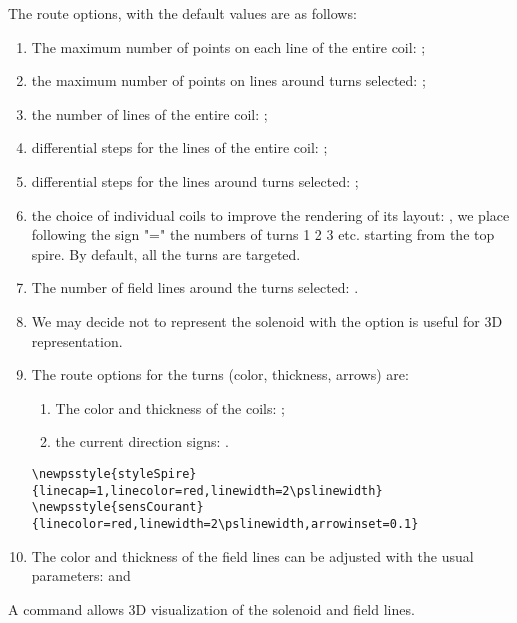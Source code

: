 \documentclass[11pt,english,BCOR10mm,DIV12,bibliography=totoc,parskip=false,smallheadings
    headexclude,footexclude,oneside]{pst-doc}
\begin{document}
The route options, with the default values are as follows:
\begin{enumerate}
  \item The maximum number of points on each line of the entire coil: ;
  \item the maximum number of points on lines around turns selected: ;
  \item the number of lines of the entire coil: ;
  \item differential steps for the lines of the entire coil: ;
  \item differential steps for the lines around turns selected: ;
  \item the choice of individual coils to improve the rendering of its
      layout: , we place following the sign "=" the numbers of turns \textsf{1 2 3 etc.} 
      starting from the top spire. By default, all the turns are targeted.
  \item The number of field lines around the turns selected: .
  \item We may decide not to represent the solenoid with the option 
      is useful for 3D representation.
  \item The route options for the turns (color, thickness, arrows) are:
  \begin{enumerate}
        \item The color and thickness of the coils: ;
        \item the current direction signs: .
  \end{enumerate}
\begin{verbatim}
\newpsstyle{styleSpire}{linecap=1,linecolor=red,linewidth=2\pslinewidth}
\newpsstyle{sensCourant}{linecolor=red,linewidth=2\pslinewidth,arrowinset=0.1}
\end{verbatim}
      
 \item The color and thickness of the field lines can be adjusted with the 
      usual  parameters:  and  
\end{enumerate}

A command  allows 3D visualization of the solenoid and
field lines. 

\begin{BDef}
\OptArgs{}\\
\OptArgs{}
\end{BDef}
\end{document}

